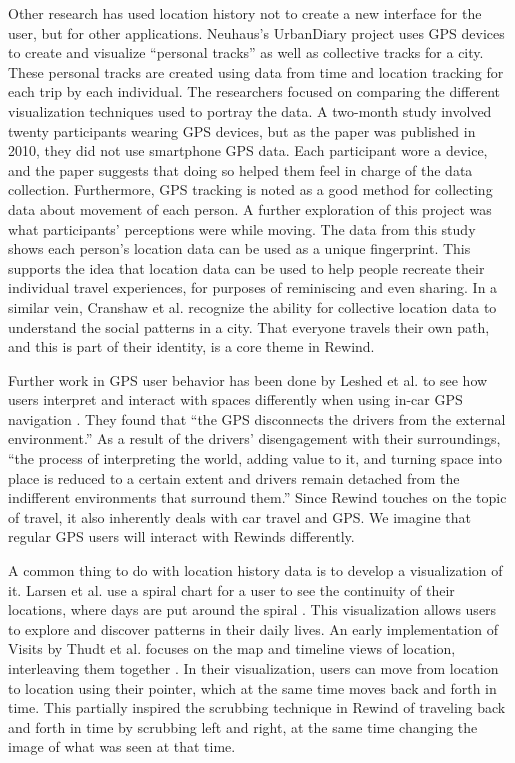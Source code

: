 \documentclass{sigchi}
\begin{document}
Other research has used location history not to create a new interface for the user, but for other applications. Neuhaus's UrbanDiary project \cite{neuhaus2010urbandiary} uses GPS devices to create and visualize ``personal tracks'' as well as collective tracks for a city. These personal tracks are created using data from time and location tracking for each trip by each individual. The researchers focused on comparing the different visualization techniques used to portray the data. A two-month study involved twenty participants wearing GPS devices, but as the paper was published in 2010, they did not use smartphone GPS data. Each participant wore a device, and the paper suggests that doing so helped them feel in charge of the data collection. Furthermore, GPS tracking is noted as a good method for collecting data about movement of each person. A further exploration of this project was what participants' perceptions were while moving. The data from this study shows each person's location data can be used as a unique fingerprint. This supports the idea that location data can be used to help people recreate their individual travel experiences, for purposes of reminiscing and even sharing. In a similar vein, Cranshaw et al. \cite{cranshaw2012livehoods} recognize the ability for collective location data to understand the social patterns in a city. That everyone travels their own path, and this is part of their identity, is a core theme in Rewind.

Further work in GPS user behavior has been done by Leshed et al. to see how users interpret and interact with spaces differently when using in-car GPS navigation \cite{leshed2008car}. They found that ``the GPS disconnects the drivers from the external environment.'' As a result of the drivers' disengagement with their surroundings, ``the process of interpreting the world, adding value to it, and turning space into place is reduced to a certain extent and drivers remain detached from the indifferent environments that surround them.'' Since Rewind touches on the topic of travel, it also inherently deals with car travel and GPS. We imagine that regular GPS users will interact with Rewinds differently.

A common thing to do with location history data is to develop a visualization of it. Larsen et al. use a spiral chart for a user to see the continuity of their locations, where days are put around the spiral \cite{larsen2013qs}. This visualization allows users to explore and discover patterns in their daily lives. An early implementation of Visits by Thudt et al. focuses on the map and timeline views of location, interleaving them together \cite{thudt2013visits}. In their visualization, users can move from location to location using their pointer, which at the same time moves back and forth in time. This partially inspired the scrubbing technique in Rewind of traveling back and forth in time by scrubbing left and right, at the same time changing the image of what was seen at that time.
 
\end{document}
